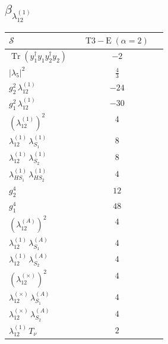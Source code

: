 \documentclass[9pt]{article}
\begin{document}
\subsection*{$ \beta_{\lambda_{12}^{(1)}} $}
\begin{longtable}{@{}p{0.31\linewidth}c@{}}
\toprule
$\mathcal{S}$ & $ \mathrm{T3-E}\;(\alpha=2) $ \\
\midrule
$ \operatorname{Tr}(y_1^\dagger y_1y_2^\dagger y_2) $ & $ -2 $ \\
$ |\lambda_5|^2 $ & $ \frac{4}{3} $ \\
$ g_2^2\,\lambda_{12}^{(1)} $ & $ -24 $ \\
$ g_1^2\,\lambda_{12}^{(1)} $ & $ -30 $ \\
$ \left(\lambda_{12}^{(1)}\right)^2 $ & $ 4 $ \\
$ \lambda_{12}^{(1)}\,\lambda_{S_1}^{(1)} $ & $ 8 $ \\
$ \lambda_{12}^{(1)}\,\lambda_{S_2}^{(1)} $ & $ 8 $ \\
$ \lambda_{HS_1}^{(1)}\,\lambda_{HS_2}^{(1)} $ & $ 4 $ \\
$ g_2^4 $ & $ 12 $ \\
$ g_1^4 $ & $ 48 $ \\
$ \left(\lambda_{12}^{(A)}\right)^2 $ & $ 4 $ \\
$ \lambda_{12}^{(1)}\,\lambda_{S_1}^{(A)} $ & $ 4 $ \\
$ \lambda_{12}^{(1)}\,\lambda_{S_2}^{(A)} $ & $ 4 $ \\
$ \left(\lambda_{12}^{(\times)}\right)^2 $ & $ 4 $ \\
$ \lambda_{12}^{(\times)}\,\lambda_{S_1}^{(A)} $ & $ 4 $ \\
$ \lambda_{12}^{(\times)}\,\lambda_{S_2}^{(A)} $ & $ 4 $ \\
$ \lambda_{12}^{(1)}\,T_\nu $ & $ 2 $ \\
\bottomrule
\end{longtable}
\end{document}
